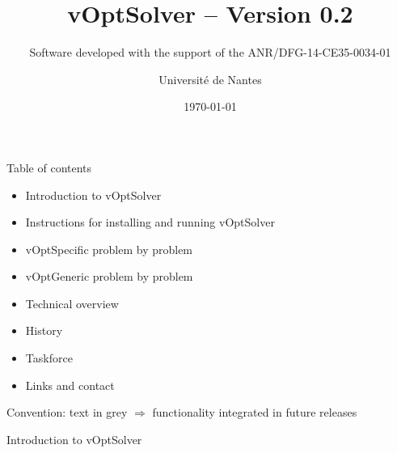 \documentclass[10pt,xcolor=dvipsnames]{beamer}
\title{{vOptSolver -- Version 0.2 }}
\subtitle{Software developed with the support of the ANR/DFG-14-CE35-0034-01}
\date{\today}
\author{Universit\'e de Nantes}%
\institute{\url{https://github.com/vOptSolver}\\ \url{https://voptsolver.github.io/vOptSpecific/}\\ \url{https://voptsolver.github.io/vOptGeneric/}}
\newcommand{\grey}{\textcolor{black!25}}
\begin{document}
\maketitle

%
% 
\begin{frame}{Table of contents}

\begin{itemize}

  \item Introduction to vOptSolver
  \item Instructions for installing and running vOptSolver 
  \item vOptSpecific problem by problem
  \item vOptGeneric problem by problem
  \item Technical overview
  \item History
  \item Taskforce
  \item Links and contact

\end{itemize}
\vspace{10mm}

Convention: \grey{text in grey} $\Rightarrow$ functionality integrated in future releases

\end{frame}

%
% 
\begin{frame}

\begin{center}
{\Large
 \textcolor[RGB]{52,57,176}{
   Introduction to vOptSolver
 }
} 
\end{center}
\end{frame}
\end{document}

